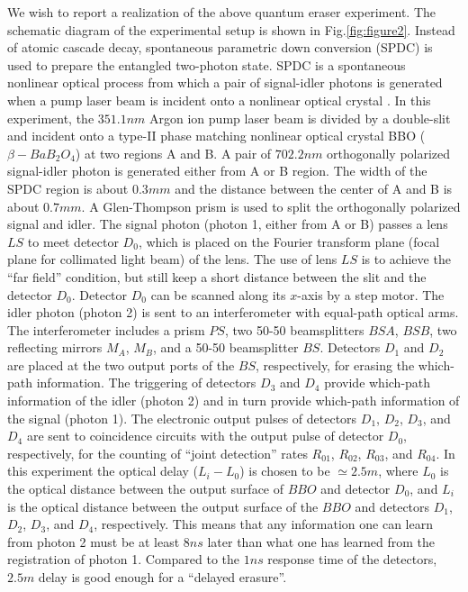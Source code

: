 \documentclass[pra,aps,epsf,12pt]{revtex4-2}
\begin{document}
We wish to report a realization of the above quantum eraser experiment. The schematic
diagram of the experimental setup is shown in Fig.\ref{fig:figure2}. Instead of atomic
cascade decay, spontaneous parametric down conversion (SPDC) is used to prepare the
entangled two-photon state. SPDC is a spontaneous nonlinear optical process from which a
pair of signal-idler photons is generated when a pump laser beam is incident onto a
nonlinear optical crystal \cite{SPDC}. In this experiment, the $351.1nm$ Argon ion pump
laser beam is divided by a double-slit and incident onto a type-II phase matching
\cite{typeII} nonlinear optical crystal BBO ($\beta-BaB_{2}O_{4}$) at two regions A and
B. A pair of $702.2nm$ orthogonally polarized signal-idler photon is generated either
from A or B region. The width of the SPDC region is about $0.3mm$ and the distance
between the center of A and B is about $0.7mm$. A Glen-Thompson prism is used to split
the orthogonally polarized signal and idler. The signal photon (photon 1, either from A
or B) passes a lens $LS$ to meet detector $D_{0}$, which is placed on the Fourier
transform plane (focal plane for collimated light beam) of the lens. The use of lens $LS$
is to achieve the ``far field'' condition, but still keep a short distance between the
slit and the detector $D_{0}$. Detector $D_{0}$ can be scanned along its $x$-axis by a
step motor. The idler photon (photon 2) is sent to an interferometer with equal-path
optical arms. The interferometer includes a prism $PS$, two 50-50 beamsplitters $BSA$,
$BSB$, two reflecting mirrors $M_{A}$, $M_{B}$, and a 50-50 beamsplitter $BS$. Detectors
$D_{1}$ and $D_{2}$ are placed at the two output ports of the $BS$, respectively, for
erasing the which-path information. The triggering of detectors $D_{3}$ and $D_{4}$
provide which-path information of the idler (photon 2) and in turn provide which-path
information of the signal (photon 1). The electronic output pulses of detectors $D_{1}$,
$D_{2}$, $D_{3}$, and $D_{4}$ are sent to coincidence circuits with the output pulse of
detector $D_{0}$,
respectively, for the counting of ``joint detection'' rates $R_{01}$, $%
R_{02} $, $R_{03}$, and $R_{04}$. In this experiment the optical delay ($%
L_{i}-L_{0} $) is chosen to be $\simeq 2.5m$, where $L_{0}$ is the
optical
distance between the output surface of $BBO$ and detector $D_{0}$, and $%
L_{i} $ is the optical distance between the output surface of the $BBO$ and detectors
$D_{1} $, $D_{2}$, $D_{3}$, and $D_{4}$, respectively. This means that any information
one can learn from photon 2 must be at least $8ns$ later
than what one has learned from the registration of photon 1. Compared to the $%
1ns$ response time of the detectors, $2.5m$ delay is good enough
for a ``delayed erasure''.
\end{document}
